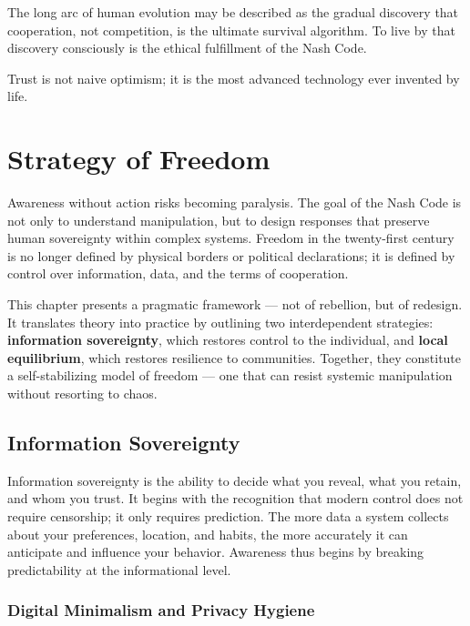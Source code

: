 \documentclass[12pt,twoside]{book}
\begin{document}
The long arc of human evolution may be described as the gradual discovery that cooperation, not competition, is the ultimate survival algorithm.  
To live by that discovery consciously is the ethical fulfillment of the Nash Code.\\

\begin{keyidea}
Trust is not naive optimism; it is the most advanced technology ever invented by life.
\end{keyidea}


\chapter{Strategy of Freedom}

Awareness without action risks becoming paralysis.  
The goal of the Nash Code is not only to understand manipulation, but to design responses that preserve human sovereignty within complex systems.  
Freedom in the twenty-first century is no longer defined by physical borders or political declarations; it is defined by control over information, data, and the terms of cooperation.  

This chapter presents a pragmatic framework --- not of rebellion, but of redesign.  
It translates theory into practice by outlining two interdependent strategies: \textbf{information sovereignty}, which restores control to the individual, and \textbf{local equilibrium}, which restores resilience to communities.  
Together, they constitute a self-stabilizing model of freedom --- one that can resist systemic manipulation without resorting to chaos.

\section{Information Sovereignty}

Information sovereignty is the ability to decide what you reveal, what you retain, and whom you trust.  
It begins with the recognition that modern control does not require censorship; it only requires prediction.  
The more data a system collects about your preferences, location, and habits, the more accurately it can anticipate and influence your behavior.  
Awareness thus begins by breaking predictability at the informational level.

\subsection*{Digital Minimalism and Privacy Hygiene}
\end{document}
